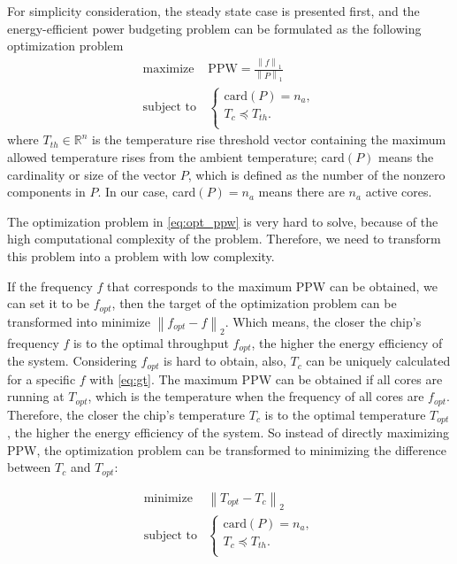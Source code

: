 For simplicity consideration, the steady state case is presented first, and the energy-efficient power budgeting problem can be formulated as the following optimization problem
\begin{equation}\label{eq:opt_ppw}
\begin{split}
\text{maximize } & \text{PPW} = \frac{\left \| f \right \|_{1}}{\left \| P \right \|_{1}}\\
\text{subject to} &\left\{
\begin{array}{lr}
\text{card}(P) = n_{a},\\
T_{c} \preceq T_{th}.\\
\end{array}
\right.
\end{split}
\end{equation}
where $T_{th} \in \mathbb{R}^{n}$ is the temperature rise threshold vector containing the maximum allowed temperature rises from the ambient temperature; card$(P)$ means the cardinality or size of the vector $P$, which is defined as the number of the nonzero components in $P$. In our case, card$(P) = n_{a}$ means there are $n_{a}$ active cores.

The optimization problem in \eqref{eq:opt_ppw} is very hard to solve, because of the high computational complexity of the problem. Therefore, we need to transform this problem into a problem with low complexity.

If the frequency $f$ that corresponds to the maximum PPW can be obtained, we can set it to be $f_{opt}$, then the target of the optimization problem can be transformed into $\text{minimize }   \left \| f_{opt} - f \right \|_{2}$. Which means, the closer the chip's frequency $f$ is to the optimal throughput $f_{opt}$, the higher the energy efficiency of the system. Considering $f_{opt}$ is hard to obtain, also, $T_{c}$ can be uniquely calculated for a specific $f$ with \eqref{eq:gt}. The maximum PPW can be obtained if all cores are running at $T_{opt}$, which is the temperature when the frequency of all cores are $f_{opt}$. Therefore, the closer the chip's temperature $T_{c}$ is to the optimal temperature $T_{opt}$, the higher the energy efficiency of the system. So instead of directly maximizing PPW, the optimization problem can be transformed to minimizing the difference between $T_{c}$ and $T_{opt}$:

\begin{equation}\label{eq:opt_topt}
\begin{split}
\text{minimize } &  \left \| T_{opt} - T_{c} \right \|_{2}\\
\text{subject to} &\left\{
\begin{array}{lr}
\text{card}(P) = n_{a},\\
T_{c} \preceq T_{th}.\\
\end{array}
\right.
\end{split}
\end{equation}

